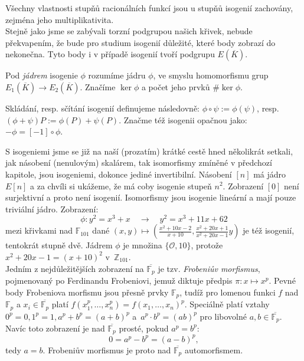\documentclass [12pt]{report}
\begin{document}
Všechny vlastnosti stupňů racionálních funkcí jsou u stupňů isogenií zachovány, zejména jeho multiplikativita.\\

Stejně jako jsme se zabývali torzní podgrupou našich křivek, nebude překvapením, že bude pro studium isogenií důležité, které body zobrazí do nekonečna. Tyto body i v případě isogenií tvoří podgrupu $E(\overline{K})$.


\begin{definice}
Pod \textit{jádrem} isogenie $\phi$ rozumíme jádru $\phi$, ve smyslu homomorfismu grup $E_1 (\overline{K})\longrightarrow E_2(\overline{K})$. Značíme $\ker \phi$ a počet jeho prvků $\# \ker \phi$. 
\end{definice}
\begin{znaceni}
Skládání, resp. sčítání isogenií definujeme následovně: $\phi \circ \psi  := \phi(\psi)$, resp.  $(\phi + \psi)P := \phi(P)+\psi(P)$. Značme též isogenii opačnou jako: $- \phi  = [-1] \circ \phi$.
\end{znaceni}

S isogeniemi jsme se již na naší (prozatím) krátké cestě hned několikrát setkali, jak násobení (nenulovým) skalárem, tak isomorfismy zmíněné v předchozí kapitole, jsou isogeniemi, dokonce jediné invertibilní. Násobení $[n]$ má jádro $E[n]$ a za chvíli si ukážeme, že má coby isogenie stupeň $n^2$. Zobrazení $[0]$ není surjektivní a proto není isogenií. Isomorfismy jsou isogenie lineární a mají pouze triviální jádro. Zobrazení:
\begin{equation*}
\phi : y^2 = x^3+x \quad \longrightarrow \quad y^2 =  x^3 + 11x + 62
\end{equation*}
mezi křivkami nad $\mathbb{F}_{101}$ dané $(x,y) \mapsto \left(\frac{x^2 + 10x - 2}{x+10},\frac{x^2  + 20x + 1}{x^2 + 20x - 1} y\right)$ je též isogenií, tentokrát stupně dvě. Jádrem $\phi$ je množina $\lbrace \mathcal{O},10 \rbrace$, protože $x^2 + 20x - 1 = (x+10)^2$ v~$\mathbb{Z}_{101}$.\\

Jedním z nejdůležitějších zobrazení na $\overline{\mathbb{F}_p}$ je tzv. \textit{Frobeniův morfismus}, pojmenovaný po Ferdinandu Frobeniovi, jemuž diktuje předpis $\pi: x \mapsto x^p$. Pevné body Frobeniova morfismu jsou přesně prvky $\mathbb{F}_p$, tudíž pro lomenou funkci $f$ nad $\mathbb{F}_p$ a $x_i \in \overline{\mathbb{F}_p}$ platí $f(x_1^p,\dots,x_n^p)=f(x_1,\dots,x_n)^p$. Speciálně platí vztahy $0^p = 0, 1^p = 1, a^p + b^p = (a+b)^p$ a~$a^p \cdot b^p = (ab)^p$ pro libovolné $a,b \in \overline{\mathbb{F}_p}$. Navíc toto zobrazení je nad $\overline{\mathbb{F}_p}$ prosté, pokud $a^p = b^p$:
\begin{equation*}
0 = a^p - b^p =  (a-b)^p,
\end{equation*} tedy $a=b$. Frobeniův morfismus je proto nad $\overline{\mathbb{F}_p}$ automorfismem.\\
\end{document}
